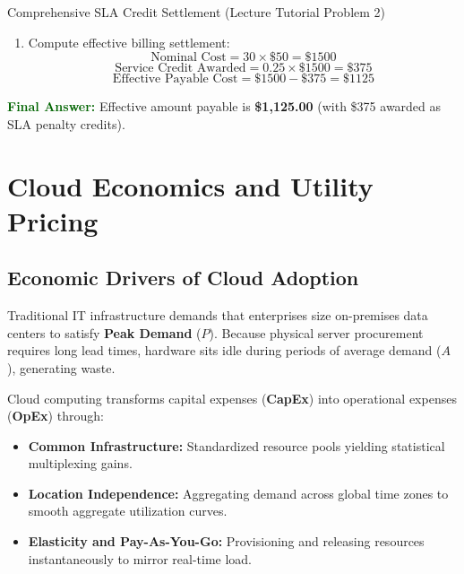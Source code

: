 \documentclass[11pt,a4paper,openany]{report}
\newcommand{\Answer}{\par\textbf{\textcolor{darkgreen}{Final Answer:}} }
\begin{document}
\begin{solved}{Comprehensive SLA Credit Settlement (Lecture Tutorial Problem 2)}
\begin{enumerate}[leftmargin=*]
  Since $97.315\% < 99.00\%$, the violation triggers the higher \textbf{25\% Service Credit}.
  \item Compute effective billing settlement:
  \begin{equation}
  \text{Nominal Cost} = 30 \times \$50 = \$1500
  \end{equation}
  \begin{equation}
  \text{Service Credit Awarded} = 0.25 \times \$1500 = \$375
  \end{equation}
  \begin{equation}
  \text{Effective Payable Cost} = \$1500 - \$375 = \$1125
  \end{equation}
\end{enumerate}
\Answer Effective amount payable is \textbf{\$1,125.00} (with \$375 awarded as SLA penalty credits).
\end{solved}

\section{Cloud Economics and Utility Pricing}
\subsection{Economic Drivers of Cloud Adoption}
Traditional IT infrastructure demands that enterprises size on-premises data centers to satisfy \textbf{Peak Demand} ($P$). Because physical server procurement requires long lead times, hardware sits idle during periods of average demand ($A$), generating waste.

Cloud computing transforms capital expenses (\textbf{CapEx}) into operational expenses (\textbf{OpEx}) through:
\begin{itemize}[leftmargin=*]
  \item \textbf{Common Infrastructure:} Standardized resource pools yielding statistical multiplexing gains.
  \item \textbf{Location Independence:} Aggregating demand across global time zones to smooth aggregate utilization curves.
  \item \textbf{Elasticity and Pay-As-You-Go:} Provisioning and releasing resources instantaneously to mirror real-time load.
\end{itemize}
\end{document}
